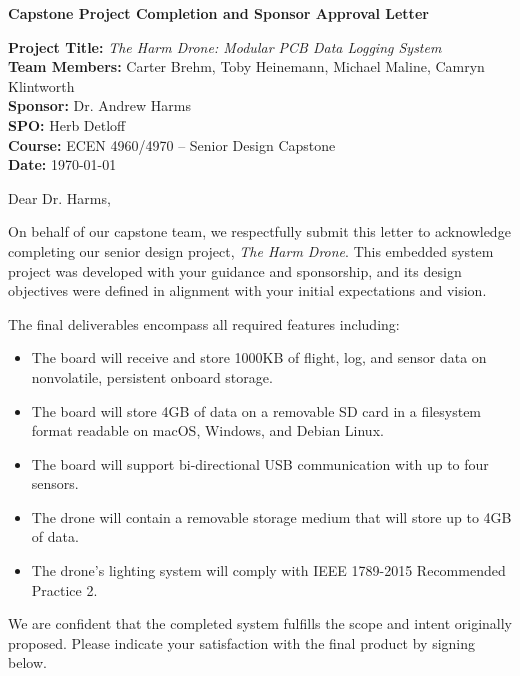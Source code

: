 \documentclass[11pt]{letter}
\begin{document}
\begin{center}
    \large \textbf{Capstone Project Completion and Sponsor Approval Letter}
\end{center}

\vspace{1em}

\noindent\textbf{Project Title:} \textit{The Harm Drone: Modular PCB Data Logging System} \\
\textbf{Team Members:} Carter Brehm, Toby Heinemann, Michael Maline, Camryn Klintworth \\
\textbf{Sponsor:} Dr. Andrew Harms \\
\textbf{SPO:} Herb Detloff \\
\textbf{Course:} ECEN 4960/4970 – Senior Design Capstone \\
\textbf{Date:} \today

\vspace{1.5em}

\noindent Dear Dr. Harms,

\vspace{1em}

On behalf of our capstone team, we respectfully submit this letter to acknowledge completing our senior design project, \textit{The Harm Drone}. This embedded system project was developed with your guidance and sponsorship, and its design objectives were defined in alignment with your initial expectations and vision.

The final deliverables encompass all required features including:
\begin{itemize}
   \item The board will receive and store 1000KB of flight, log, and sensor data on nonvolatile, persistent onboard storage. 
    \item The board will store 4GB of data on a removable SD card in a filesystem format readable on macOS, Windows, and Debian Linux. 
    \item The board will support bi-directional USB communication with up to four sensors.
    \item The drone will contain a removable storage medium that will store up to 4GB of data.
    \item The drone’s lighting system will comply with IEEE 1789-2015 Recommended Practice 2.
\end{itemize}

We are confident that the completed system fulfills the scope and intent originally proposed. Please indicate your satisfaction with the final product by signing below.
\end{document}
